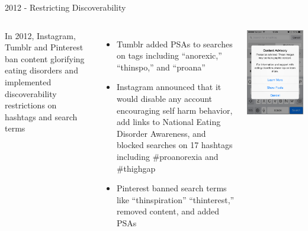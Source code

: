 \documentclass[nobackground,dvipsnames,table]{beamer}
\begin{document}
\begin{frame}{2012 - Restricting Discoverability}
    \begin{columns}
            \small
            In 2012, Instagram, Tumblr and Pinterest ban content glorifying eating disorders and implemented discoverability restrictions on hashtags and search terms\\
            \begin{itemize}
                \footnotesize
                \item Tumblr added PSAs to searches on tags including “anorexic,” “thinspo,” and “proana”
                \item Instagram announced that it would disable any account encouraging self harm behavior, add links to National Eating Disorder Awareness, and blocked searches on 17 hashtags including \#proanorexia and \#thighgap
                \item Pinterest banned search terms like “thinspiration” “thinterest,” removed content, and added PSAs
            \end{itemize}
            \includegraphics[width=\textwidth]{restricted-discoverability}
    \end{columns}
\end{frame}
\end{document}
